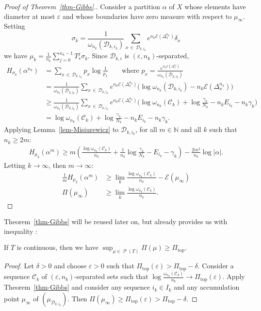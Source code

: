 \documentclass[AHL, Unicode, longabstracts,published]{cedram}
\theoremstyle{plain}
\theoremstyle{plain}
\newcommand\eps{\varepsilon}
\newcommand\NLP{\Pi}
\renewcommand\top{{\mathrm{top}}}
\newcommand\Prob{{\operatorname{\mathscr{P}}}}
\newcounter{In}
\newcommand{\Inref}[1]{\Circled{\ref{#1}}}
\newcommand*\8{\infty}
\newcommand\NN{\mathbb{N}}
\newcommand{\En}{\mathcal{E}}
\newcommand{\cD}{\mathcal{D}}
\newcommand{\cC}{\mathcal C}
\begin{document}
\begin{proof}[Proof of Theorem~\ref{thm-Gibbs}.]
Consider a partition $\alpha$ of $X$ whose elements have diameter at most $\eps$ and whose boundaries have zero measure with respect to $\mu_\infty$. Setting
\[
\sigma_k = \frac{1}{\omega_{n_k}(\cD_{k,i_k})} \sum_{x\,\in\,\cD_{k,i_k}} e^{n_k \En\left(\Delta_x^{n_k}\right)}\delta_x
\]
we have $\mu_k= \frac{1}{n_k} \sum_{j=0}^{n_k-1} T_*^j \sigma_k$. Since $\cD_{k,i}$ is $(\eps,n_k)$-separated,
\begin{align*}
H_{\sigma_k}(\alpha^{n_k}) &= \sum_{x\,\in\,\cD_{k,i_k}} p_x \log\frac{1}{p_x} \qquad\text{where } p_x = \frac{e^{n_k \En\left(\Delta_x^{n_k}\right)}}{\omega_{n_k}(\cD_{k,i_k})} \\
&= \frac{1}{\omega_{n_k}(\cD_{k,i_k})} \sum_{x\,\in\,\cD_{k,i_k}}e^{n_k \En\left(\Delta_x^{n_k}\right)} \big(\log \omega_{n_k}(\cD_{k,i_k}) -n_k\En\left(\Delta_x^{n_k}\right)\big) \\
&\ge \frac{1}{\omega_{n_k}(\cD_{k,i_k})} \sum_{x\,\in\,\cD_{k,i_k}}e^{n_k \En\left(\Delta_x^{n_k}\right)} \big(\log \omega_{n_k}(\cC_{k})+\log\frac{\gamma_k}{N_k} -n_k E_{i_k} -n_k\gamma_k\big) \\
&= \log \omega_{n_k}(\cC_{k})+\log\frac{\gamma_k}{N_k} -n_k E_{i_k} -n_k\gamma_k.
\end{align*}
Applying Lemma~\ref{lem-Misiurewicz} to $\cD_{k,{i_k}}$, for all $m\in\NN$ and all $k$ such that $n_k\ge 2m$:
\begin{align*}
H_{\mu_k}\left(\alpha^{m}\right)\ge m\left(\frac{\log \omega_{n_k}(\cC_{k})}{n_k}+ \frac1{n_k}\log\frac{\gamma_k}{N_k} - E_{i_k} -\gamma_k\right) -\frac{2m^2}{n_k}\log\lvert\alpha\rvert.
\end{align*}
Letting $k\to\infty$, then $m\to \infty$:
\begin{align*}
\frac 1m H_{\mu_k}(\alpha^{m}) &\ge \lim_k \frac{\log \omega_{n_k}(\cC_{k})}{n_k} -\En(\mu_\infty) \\
\NLP(\mu_\infty) &\ge \lim_k \frac{\log \omega_{n_k}(\cC_{k})}{n_k}.
\end{align*}
\end{proof}

Theorem~\ref{thm-Gibbs} will be reused later on, but already provides us with inequality \Inref{In:3}:

\begin{prop}\label{prop-lower-bound}
If $T$ is continuous, then we have $\sup_{\mu\in\Prob(T)} \NLP(\mu) \ge \NLP_\top$.
\end{prop}

\begin{proof}
Let $\delta>0$ and choose $\varepsilon>0$ such that $\NLP_\top(\varepsilon)>\NLP_\top-\delta$. Consider a sequence $\cC_k$ of $(\varepsilon,n_k)$-separated sets such that $\log\frac{\omega_{n_k}(\cC_k)}{n_k} \to \NLP_\top(\varepsilon)$. Apply Theorem~\ref{thm-Gibbs} and consider any sequence $i_k\in I_k$ and any accumulation point $\mu_\infty$ of $(\mu_{\cD_{k,i_k}})$. Then $\NLP(\mu_\infty)\ge \NLP_\top(\varepsilon)>\NLP_\top-\delta$.
\end{proof}
\end{document}
